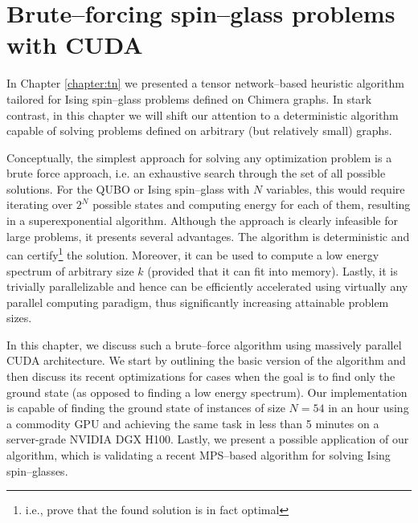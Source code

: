 \chapter{Brute--forcing spin--glass problems with CUDA}
\label{chapter:bruteforce}
In Chapter \ref{chapter:tn} we presented a tensor network--based heuristic algorithm
tailored for Ising spin--glass problems defined on Chimera graphs. In stark contrast, in this
chapter we will shift our attention to a deterministic algorithm capable of solving problems defined
on arbitrary (but relatively small) graphs.

Conceptually, the simplest approach for solving any optimization problem is a
brute force approach, i.e. an exhaustive search through the set of all possible
solutions. For the QUBO or Ising spin--glass with $N$ variables, this would
require iterating over $2^{N}$ possible states and computing energy for each of
them, resulting in a superexponential algorithm. Although the approach is
clearly infeasible for large problems, it presents several advantages. The
algorithm is deterministic and can certify\footnote{i.e., prove that the found
  solution is in fact optimal} the solution. Moreover, it can be used to compute
a low energy spectrum of arbitrary size $k$ (provided that it can fit into
memory). Lastly, it is trivially parallelizable and hence can be efficiently
accelerated using virtually any parallel computing paradigm, thus significantly
increasing attainable problem sizes.

In this chapter, we discuss such a brute--force algorithm using massively
parallel CUDA architecture. We start by outlining the basic version of the
algorithm and then discuss its recent optimizations for cases when the goal is
to find only the ground state (as opposed to finding a low energy spectrum).
Our implementation is capable of finding the ground state of instances of size
$N=54$ in an hour using a commodity GPU and achieving the same task in less
than 5 minutes on a server-grade NVIDIA DGX H100. Lastly, we present a possible
application of our algorithm, which is validating a recent MPS--based algorithm
for solving Ising spin--glasses.


